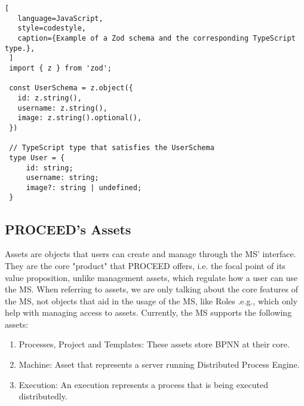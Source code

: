  \begin{lstlisting}[
   language=JavaScript,
   style=codestyle,
   caption={Example of a Zod schema and the corresponding TypeScript type.},
 ]
 import { z } from 'zod';

 const UserSchema = z.object({
   id: z.string(),
   username: z.string(),
   image: z.string().optional(),
 })

 // TypeScript type that satisfies the UserSchema
 type User = {
     id: string;
     username: string;
     image?: string | undefined;
 }
 \end{lstlisting}


%

\subsection{PROCEED's Assets}
\label{cha:relatedwork:proceed-assets}

Assets are objects that users can create and manage through the MS' interface.
They are the core "product" that PROCEED offers, i.e. the focal point of its value
proposition,
unlike management assets, which regulate how a user can use the MS.
When referring to assets, we are only talking about the core features of the MS, not
objects that aid in the usage of the MS, like Roles .e.g., which only help with managing
access to assets.
Currently, the MS supports the following assets:

\begin{enumerate}
	\item Processes, Project and Templates: These assets store BPNN at their core.
	\item Machine: Asset that represents a server running Distributed Process Engine. 
	\item Execution: An execution represents a process that is being executed distributedly.
\end{enumerate}

